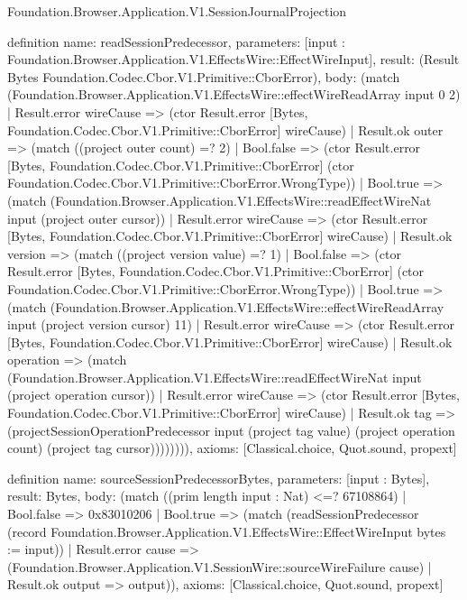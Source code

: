 \begin{lexlean}{Foundation.Browser.Application.V1.SessionJournalProjection}
\begin{semanticmodule}
definition{
  name: readSessionPredecessor,
  parameters: [input : Foundation.Browser.Application.V1.EffectsWire::EffectWireInput],
  result: (Result Bytes Foundation.Codec.Cbor.V1.Primitive::CborError),
  body: (match (Foundation.Browser.Application.V1.EffectsWire::effectWireReadArray input 0 2)
    | Result.error wireCause => (ctor Result.error [Bytes, Foundation.Codec.Cbor.V1.Primitive::CborError] wireCause)
    | Result.ok outer => (match ((project outer count) =? 2)
      | Bool.false => (ctor Result.error [Bytes, Foundation.Codec.Cbor.V1.Primitive::CborError] (ctor Foundation.Codec.Cbor.V1.Primitive::CborError.WrongType))
      | Bool.true => (match (Foundation.Browser.Application.V1.EffectsWire::readEffectWireNat input (project outer cursor))
        | Result.error wireCause => (ctor Result.error [Bytes, Foundation.Codec.Cbor.V1.Primitive::CborError] wireCause)
        | Result.ok version => (match ((project version value) =? 1)
          | Bool.false => (ctor Result.error [Bytes, Foundation.Codec.Cbor.V1.Primitive::CborError] (ctor Foundation.Codec.Cbor.V1.Primitive::CborError.WrongType))
          | Bool.true => (match (Foundation.Browser.Application.V1.EffectsWire::effectWireReadArray input (project version cursor) 11)
            | Result.error wireCause => (ctor Result.error [Bytes, Foundation.Codec.Cbor.V1.Primitive::CborError] wireCause)
            | Result.ok operation => (match (Foundation.Browser.Application.V1.EffectsWire::readEffectWireNat input (project operation cursor))
              | Result.error wireCause => (ctor Result.error [Bytes, Foundation.Codec.Cbor.V1.Primitive::CborError] wireCause)
              | Result.ok tag => (projectSessionOperationPredecessor input (project tag value) (project operation count) (project tag cursor)))))))),
  axioms: [Classical.choice, Quot.sound, propext]
}

definition{
  name: sourceSessionPredecessorBytes,
  parameters: [input : Bytes],
  result: Bytes,
  body: (match ((prim length input : Nat) <=? 67108864)
    | Bool.false => 0x83010206
    | Bool.true => (match (readSessionPredecessor (record Foundation.Browser.Application.V1.EffectsWire::EffectWireInput {bytes := input}))
      | Result.error cause => (Foundation.Browser.Application.V1.SessionWire::sourceWireFailure cause)
      | Result.ok output => output)),
  axioms: [Classical.choice, Quot.sound, propext]
}
\end{semanticmodule}
\end{lexlean}
